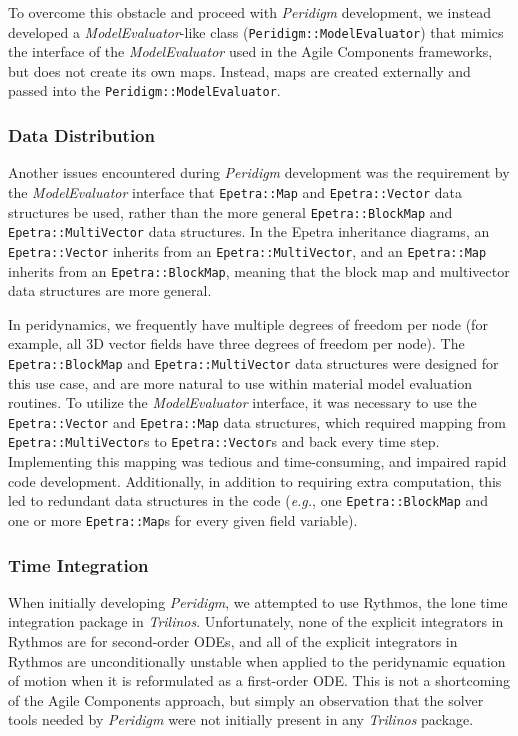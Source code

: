 \documentclass[pdf,ps2pdf,12pt,report]{SANDreport}
\theoremstyle{plain}
\theoremstyle{definition}
\theoremstyle{remark}
\numberwithin{equation}{section}
\begin{document}
To overcome this obstacle and proceed with \emph{Peridigm} development, we instead developed a \emph{ModelEvaluator}-like class (\texttt{Peridigm::ModelEvaluator}) that mimics the interface of the \emph{ModelEvaluator} used in the Agile Components frameworks, but does not create its own maps. Instead, maps are created externally and passed into the \texttt{Peridigm::ModelEvaluator}.

\subsubsection{Data Distribution}

Another issues encountered during \emph{Peridigm} development was the requirement by the \emph{ModelEvaluator} interface that \texttt{Epetra::Map} and \texttt{Epetra::Vector} data structures be used, rather than the more general \texttt{Epetra::BlockMap} and \texttt{Epetra::MultiVector} data structures. In the Epetra inheritance diagrams, an \texttt{Epetra::Vector} inherits from an \texttt{Epetra::MultiVector}, and an \texttt{Epetra::Map} inherits from an \texttt{Epetra::BlockMap}, meaning that the block map and multivector data structures are more general.

In peridynamics, we frequently have multiple degrees of freedom per node (for example, all 3D vector fields have three degrees of freedom per node). The \texttt{Epetra::BlockMap} and \texttt{Epetra::MultiVector} data structures were designed for this use case, and are more natural to use within material model evaluation routines. To utilize the \emph{ModelEvaluator} interface, it was necessary to use the \texttt{Epetra::Vector} and \texttt{Epetra::Map} data structures, which required mapping from \texttt{Epetra::MultiVector}s to \texttt{Epetra::Vector}s and back every time step. Implementing this mapping was tedious and time-consuming, and impaired rapid code development. Additionally, in addition to requiring extra computation, this led to redundant data structures in the code (\emph{e.g.}, one \texttt{Epetra::BlockMap} and one or more \texttt{Epetra::Map}s for every given field variable).

\subsubsection{Time Integration}

When initially developing \emph{Peridigm}, we attempted to use Rythmos, the lone time integration package in \emph{Trilinos}. Unfortunately, none of the explicit integrators in Rythmos are for second-order ODEs, and all of the explicit integrators in Rythmos are unconditionally unstable when applied to the peridynamic equation of motion when it is reformulated as a first-order ODE. This is not a shortcoming of the Agile Components approach, but simply an observation that the solver tools needed by \emph{Peridigm} were not initially present in any \emph{Trilinos} package.
\end{document}
